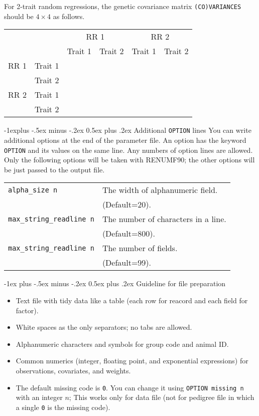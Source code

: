 \documentclass[10pt,landscape]{article}
\makeatletter
\renewcommand{\section}{\@startsection{section}{1}{0mm}%
                                {-1ex plus -.5ex minus -.2ex}%
                                {0.5ex plus .2ex}%
                                {\normalfont\large\bfseries}}
\renewcommand{\subsection}{\@startsection{subsection}{2}{0mm}%
                                {-1explus -.5ex minus -.2ex}%
                                {0.5ex plus .2ex}%
                                {\normalfont\normalsize\bfseries}}
\makeatother
\begin{document}
\begin{multicols}{3}
For 2-trait random regressions, the genetic covariance matrix \verb|(CO)VARIANCES| should be $4\times 4$ as follows.

\begin{tabular}{@{}ll|c|c|c|c|@{}}
  &       &\multicolumn{2}{c}{RR 1}&\multicolumn{2}{c}{RR 2}\\
\cline{3-6}
  &       &Trait 1&Trait 2&Trait 1&Trait 2\\
\hline
RR 1&Trait 1& & & &\\
\hline
&Trait 2& & & &\\
\hline
RR 2&Trait 1& & & &\\
\hline
        &Trait 2& & & &\\
\hline
\end{tabular}

\subsection{Additional \texttt{OPTION} lines}
You can write additional options at the end of the parameter file.
An option has the keyword \verb|OPTION| and its values on the same line.
Any numbers of option lines are allowed.
Only the following options will be taken with RENUMF90; the other options will be just passed to the output file.

\begin{tabular}{@{}ll@{}}
  \verb|alpha_size n| & The width of alphanumeric field. \\
  &(Default=20).\\
  \verb|max_string_readline n| & The number of characters in a line. \\
  &(Default=800).\\
  \verb|max_string_readline n| & The number of fields. \\
  &(Default=99).\\
\end{tabular}

\section{Guideline for file preparation}
\begin{itemize}[leftmargin=*,itemsep=0pt,parsep=0pt]
  \item Text file with tidy data like a table (each row for reacord and each field for factor).
  \item White spaces as the only separators; no tabs are allowed.
  \item Alphanumeric characters and symbols for group code and animal ID.
  \item Common numerics (integer, floating point, and exponential expressions) for observations, covariates, and weights.
  \item The default missing code is \verb|0|. You can change it using \verb|OPTION missing n| with an integer $n$; This works only for data file (not for pedigree file in which a single \verb|0| is the missing code).
\end{itemize}


\end{multicols}
\end{document}
